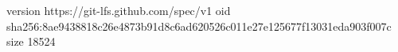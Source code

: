 version https://git-lfs.github.com/spec/v1
oid sha256:8ae9438818c26e4873b91d8c6ad620526c011e27e125677f13031eda903f007c
size 18524
